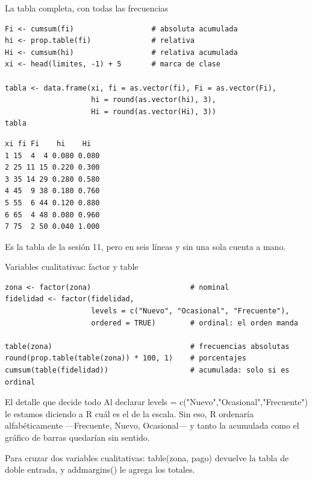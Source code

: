 \documentclass[aspectratio=169,10pt]{beamer}
\newcommand{\fx}[1]{{\ttfamily\color{uniAzul}#1}}
\begin{document}
\begin{frame}[fragile]{La tabla completa, con todas las frecuencias}
  \footnotesize
\begin{lstlisting}[style=Rcode]
Fi <- cumsum(fi)                  # absoluta acumulada
hi <- prop.table(fi)              # relativa
Hi <- cumsum(hi)                  # relativa acumulada
xi <- head(limites, -1) + 5       # marca de clase

tabla <- data.frame(xi, fi = as.vector(fi), Fi = as.vector(Fi),
                    hi = round(as.vector(hi), 3),
                    Hi = round(as.vector(Hi), 3))
tabla
\end{lstlisting}
\begin{lstlisting}[style=Rout]
  xi fi Fi    hi    Hi
1 15  4  4 0.080 0.080
2 25 11 15 0.220 0.300
3 35 14 29 0.280 0.580
4 45  9 38 0.180 0.760
5 55  6 44 0.120 0.880
6 65  4 48 0.080 0.960
7 75  2 50 0.040 1.000
\end{lstlisting}

  \vspace{-0.12cm}
  {\tiny\color{uniGris} Es  la tabla de la sesión 11,
  pero en seis líneas y sin una sola cuenta a mano.}
\end{frame}

\begin{frame}[fragile]{Variables cualitativas: \fx{factor} y \fx{table}}
  \footnotesize
\begin{lstlisting}[style=Rcode]
zona <- factor(zona)                       # nominal
fidelidad <- factor(fidelidad,
                    levels = c("Nuevo", "Ocasional", "Frecuente"),
                    ordered = TRUE)        # ordinal: el orden manda

table(zona)                                # frecuencias absolutas
round(prop.table(table(zona)) * 100, 1)    # porcentajes
cumsum(table(fidelidad))                   # acumulada: solo si es ordinal
\end{lstlisting}

  \vspace{0.05cm}
  \begin{alertblock}{El detalle que decide todo}
    \scriptsize
    Al declarar \fx{levels = c("Nuevo","Ocasional","Frecuente")} le estamos
    diciendo a R cuál es el  de la escala. Sin eso,
    R ordenaría alfabéticamente —Frecuente, Nuevo, Ocasional— y tanto la
    acumulada como el gráfico de barras quedarían sin sentido.
  \end{alertblock}

  \vspace{0.05cm}
  {\tiny\color{uniGris} Para cruzar dos variables cualitativas:
  \fx{table(zona, pago)} devuelve la tabla de doble entrada, y
  \fx{addmargins()} le agrega los totales.}
\end{frame}
\end{document}
